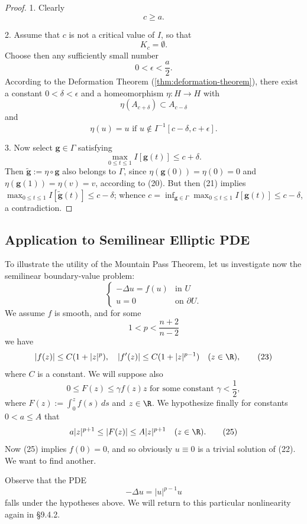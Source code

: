 \begin{proof}
1. Clearly
\[
c \ge a.
\tag{16}
\]

2. Assume that $c$ is not a critical value of $I$, so that
\[
K_c = \emptyset.
\tag{17}
\]
Choose then any sufficiently small number
\[
0 < \epsilon < \frac{a}{2}.
\tag{18}
\]
According to the Deformation Theorem (\cref{thm:deformation-theorem}), there exist a constant $0 < \delta < \epsilon$ and a homeomorphism $\eta: H \to H$ with
\[
\eta(A_{c+\delta}) \subset A_{c-\delta}
\tag{19}
\]
and
\[
\eta(u) = u \text{ if } u \notin I^{-1}[c - \delta, c + \epsilon].
\tag{20}
\]

3. Now select $\mathbf{g} \in \Gamma$ satisfying
\[
\max_{0 \le t \le 1} I[\mathbf{g}(t)] \le c + \delta.
\tag{21}
\]
Then $\tilde{\mathbf{g}} := \eta \circ \mathbf{g}$ also belongs to $\Gamma$, since $\eta(\mathbf{g}(0)) = \eta(0) = 0$ and $\eta(\mathbf{g}(1)) = \eta(v) = v$, according to (20). But then (21) implies $\max_{0 \le t \le 1} I[\tilde{\mathbf{g}}(t)] \le c - \delta$; whence $c = \inf_{\mathbf{g} \in \Gamma} \max_{0 \le t \le 1} I[\mathbf{g}(t)] \le c - \delta$, a contradiction.
\end{proof}

\subsection{Application to Semilinear Elliptic PDE}
\label{sec:semilinear-elliptic-application}

To illustrate the utility of the Mountain Pass Theorem, let us investigate now the semilinear boundary-value problem:
\[
\begin{cases}
-\Delta u = f(u) & \text{in } U \\
u = 0 & \text{on } \partial U.
\end{cases}
\tag{22}
\]
We assume $f$ is smooth, and for some
\[
1 < p < \frac{n+2}{n-2}
\]
we have
\[
|f(z)| \le C(1 + |z|^p), \quad |f'(z)| \le C(1 + |z|^{p-1}) \quad (z \in \R),
\tag{23}
\]
where $C$ is a constant. We will suppose also
\[
0 \le F(z) \le \gamma f(z)z \text{ for some constant } \gamma < \frac{1}{2},
\tag{24}
\]
where $F(z) := \int_0^z f(s)\, ds$ and $z \in \R$. We hypothesize finally for constants $0 < a \le A$ that
\[
a|z|^{p+1} \le |F(z)| \le A|z|^{p+1} \quad (z \in \R).
\tag{25}
\]
Now (25) implies $f(0) = 0$, and so obviously $u \equiv 0$ is a trivial solution of (22). We want to find another.

\begin{remark}
\label{rem:power-nonlinearity-semilinear-example}
Observe that the PDE
\[
-\Delta u = |u|^{p-1}u
\]
falls under the hypotheses above. We will return to this particular nonlinearity again in \S9.4.2.
\end{remark}

